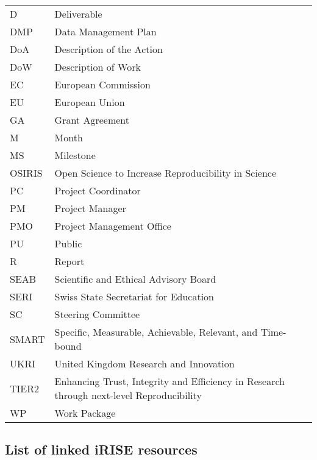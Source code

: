\documentclass[
]{article}
\begin{document}
\begin{longtable}[]{@{}
  >{\raggedright\arraybackslash}p{}
  >{\raggedright\arraybackslash}p{}@{}}
\toprule()
\endhead
D & Deliverable \\
DMP & Data Management Plan \\
DoA & Description of the Action \\
DoW & Description of Work \\
EC & European Commission \\
EU & European Union \\
GA & Grant Agreement \\
M & Month \\
MS & Milestone \\
OSIRIS & Open Science to Increase Reproducibility in Science \\
PC & Project Coordinator \\
PM & Project Manager \\
PMO & Project Management Office \\
PU & Public \\
R & Report \\
SEAB & Scientific and Ethical Advisory Board \\
SERI & Swiss State Secretariat for Education \\
SC & Steering Committee \\
SMART & Specific, Measurable, Achievable, Relevant, and Time-bound \\
UKRI & United Kingdom Research and Innovation \\
TIER2 & Enhancing Trust, Integrity and Efficiency in Research through next-level Reproducibility \\
WP & Work Package \\
\bottomrule()
\end{longtable}

\hypertarget{list-of-linked-irise-resources}{%
\subsection{List of linked iRISE resources}\label{list-of-linked-irise-resources}}
\end{document}
